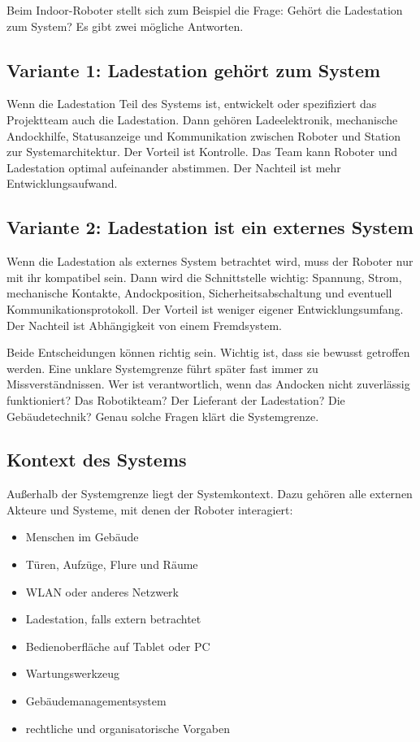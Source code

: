 Beim Indoor-Roboter stellt sich zum Beispiel die Frage: Gehört die Ladestation zum System? Es gibt zwei mögliche Antworten.

\subsection{Variante 1: Ladestation gehört zum System}
Wenn die Ladestation Teil des Systems ist, entwickelt oder spezifiziert das Projektteam auch die Ladestation. Dann gehören Ladeelektronik, mechanische Andockhilfe, Statusanzeige und Kommunikation zwischen Roboter und Station zur Systemarchitektur. Der Vorteil ist Kontrolle. Das Team kann Roboter und Ladestation optimal aufeinander abstimmen. Der Nachteil ist mehr Entwicklungsaufwand.

\subsection{Variante 2: Ladestation ist ein externes System}
Wenn die Ladestation als externes System betrachtet wird, muss der Roboter nur mit ihr kompatibel sein. Dann wird die Schnittstelle wichtig: Spannung, Strom, mechanische Kontakte, Andockposition, Sicherheitsabschaltung und eventuell Kommunikationsprotokoll. Der Vorteil ist weniger eigener Entwicklungsumfang. Der Nachteil ist Abhängigkeit von einem Fremdsystem.

Beide Entscheidungen können richtig sein. Wichtig ist, dass sie bewusst getroffen werden. Eine unklare Systemgrenze führt später fast immer zu Missverständnissen. Wer ist verantwortlich, wenn das Andocken nicht zuverlässig funktioniert? Das Robotikteam? Der Lieferant der Ladestation? Die Gebäudetechnik? Genau solche Fragen klärt die Systemgrenze.

\subsection{Kontext des Systems}
Außerhalb der Systemgrenze liegt der Systemkontext. Dazu gehören alle externen Akteure und Systeme, mit denen der Roboter interagiert:

\begin{itemize}
    \item Menschen im Gebäude
    \item Türen, Aufzüge, Flure und Räume
    \item WLAN oder anderes Netzwerk
    \item Ladestation, falls extern betrachtet
    \item Bedienoberfläche auf Tablet oder PC
    \item Wartungswerkzeug
    \item Gebäudemanagementsystem
    \item rechtliche und organisatorische Vorgaben
\end{itemize}

